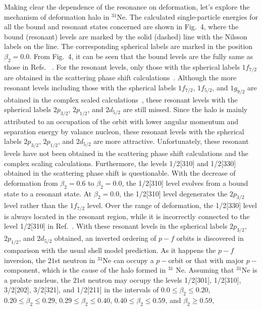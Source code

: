 \documentclass[twocolumn,prc,showpacs,preprintnumbers,superscriptaddress,floatfix]{revtex4}
\begin{document}
Making clear the dependence of the resonance on deformation, let's explore
the mechanism of deformation halo in $^{31}$Ne. The calculated
single-particle energies for all the bound and resonant states concerned are
shown in Fig.~4, where the bound (resonant) levels are marked by the solid
(dashed) line with the Nilsson labels on the line. The corresponding
spherical labels are marked in the position $\beta _{2}=0.0$. From Fig.~4,
it can be seen that the bound levels are the fully same as those in Refs.~%
\cite{Hamamoto2010,Liu2012}. For the resonant levels, only those with the
spherical labels $1f_{7/2}$ are obtained in the scattering phase shift
calculations~\cite{Hamamoto2010}. Although the more resonant levels
including those with the spherical labels $1f_{7/2}$, $1f_{5/2}$, and $%
1g_{9/2}$ are obtained in the complex scaled calculations~\cite{Liu2012},
these resonant levels with the spherical labels $2p_{3/2}$, $2p_{1/2}$, and $%
2d_{5/2}$ are still missed. Since the halo is mainly attributed to an
occupation of the orbit with lower angular momentum and separation energy by
valance nucleon, these resonant levels with the spherical labels $2p_{3/2}$,
$2p_{1/2}$, and $2d_{5/2}$ are more attractive. Unfortunately, these
resonant levels have not been obtained in the scattering phase shift
calculations and the complex scaling calculations. Furthermore, the levels
1/2[310] and 1/2[330] obtained in the scattering phase shift is
questionable. With the decrease of deformation from $\beta _{2}=0.6$ to $%
\beta _{2}=0.0$, the 1/2[310] level evolves from a bound state to a resonant
state. At $\beta _{2}=0.0$, the 1/2[310] level degenerates the $2p_{3/2}$
level rather than the $1f_{7/2}$ level. Over the range of deformation, the
1/2[330] level is always located in the resonant region, while it is
incorrectly connected to the level 1/2[310] in Ref.~\cite{Hamamoto2010}.
With these resonant levels in the spherical labels $2p_{3/2}$, $2p_{1/2}$,
and $2d_{5/2}$ obtained, an inverted ordering of $p-f$ orbits is discovered
in comparison with the usual shell model prediction. As it happens the $p-f$
inversion, the $21$st neutron in $^{31}$Ne can occupy a $p-$orbit or that
with major $p-$component, which is the cause of the halo formed in $^{31}$%
Ne. Assuming that $^{31}$Ne is a prolate nucleus, the $21$st neutron may
occupy the levels 1/2[301], 1/2[310], 3/2[202], 3/2[321], and 1/2[211] in
the intervals of $0.0\leqslant \beta _{2}\leqslant 0.20$, $0.20\leqslant
\beta _{2}\leqslant 0.29$, $0.29\leqslant \beta _{2}\leqslant 0.40$, $%
0.40\leqslant \beta _{2}\leqslant 0.59$, and $\beta _{2}\geqslant 0.59$,
\end{document}
